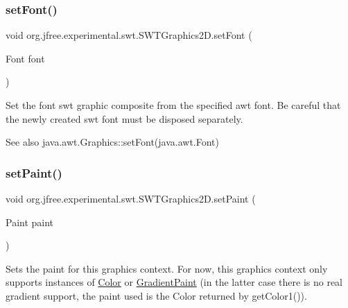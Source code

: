 \subsubsection{\texorpdfstring{set\+Font()}{setFont()}}
{\footnotesize\ttfamily void org.\+jfree.\+experimental.\+swt.\+S\+W\+T\+Graphics2\+D.\+set\+Font (\begin{DoxyParamCaption}\item[{Font}]{font }\end{DoxyParamCaption})}

Set the font swt graphic composite from the specified awt font. Be careful that the newly created swt font must be disposed separately. \begin{DoxySeeAlso}{See also}
java.\+awt.\+Graphics\+::set\+Font(java.\+awt.\+Font) 
\end{DoxySeeAlso}
\mbox{\label{classorg_1_1jfree_1_1experimental_1_1swt_1_1_s_w_t_graphics2_d_a919af710ac35847e41844dad43ed02ec}} 
\subsubsection{\texorpdfstring{set\+Paint()}{setPaint()}}
{\footnotesize\ttfamily void org.\+jfree.\+experimental.\+swt.\+S\+W\+T\+Graphics2\+D.\+set\+Paint (\begin{DoxyParamCaption}\item[{Paint}]{paint }\end{DoxyParamCaption})}

Sets the paint for this graphics context. For now, this graphics context only supports instances of \mbox{\hyperlink{}{Color}} or \mbox{\hyperlink{}{Gradient\+Paint}} (in the latter case there is no real gradient support, the paint used is the {\ttfamily Color} returned by {\ttfamily get\+Color1()}).


